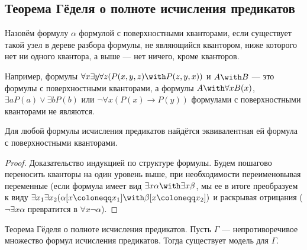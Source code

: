 \subsection{Теорема Гёделя о полноте исчисления предикатов}

\begin{definition}
Назовём формулу $\alpha$ формулой с поверхностными кванторами,
если существует такой узел в дереве разбора формулы, не являющийся
квантором, ниже которого нет ни одного квантора, а выше --- 
нет ничего, кроме кванторов.
\end{definition}

Например, формулы $\forall x \exists y \forall z (P(x,y,z) \with P(z,y,x))$ и 
$A \with B$ --- это формулы с поверхностными кванторами, а формулы 
$A \with \forall x B(x)$, $\exists a P(a) \vee \exists b P(b)$
или $\neg \forall x (P (x) \rightarrow P(y))$
формулами с поверхностными кванторами не являются.

\begin{lemma}
Для любой формулы исчисления предикатов найдётся эквивалентная
ей формула с поверхностными кванторами.
\end{lemma}

\begin{proof}Доказательство индукцией по структуре формулы.
Будем пошагово переносить кванторы на один уровень выше, при 
необходимости переименовывая переменные (если формула имеет вид
$\exists x \alpha \with \exists x \beta$, мы ее в итоге преобразуем к виду
$\exists x_1 \exists x_2 (\alpha [x \coloneqq  x_1] \with \beta [x \coloneqq  x_2])$ 
и раскрывая отрицания
($\neg \exists x \alpha$ превратится в $\forall x \neg \alpha$).
\end{proof}

\begin{theorem}{Теорема Гёделя о полноте исчисления предикатов.}
Пусть $\Gamma$ --- непротиворечивое множество формул исчисления предикатов.
Тогда существует модель для $\Gamma$.
\end{theorem}

